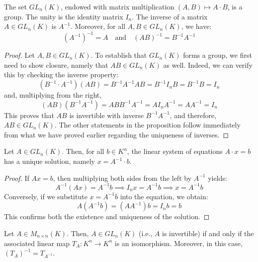 \begin{proposition} \label{prop:17.a.7}
The set $GL_n(K)$, endowed with matrix multiplication $(A, B) \mapsto A \cdot B$, is a group. The unity is the identity matrix $I_n$. The inverse of a matrix $A \in GL_n(K)$ is $A^{-1}$. Moreover, for all $A, B \in GL_n(K)$, we have:
\begin{equation*}
    (A^{-1})^{-1} = A \quad \text{and} \quad (AB)^{-1} = B^{-1}A^{-1}
\end{equation*}
\end{proposition}

\begin{proof}
Let $A, B \in GL_n(K)$. To establish that $GL_n(K)$ forms a group, we first need to show closure, namely that $AB \in GL_n(K)$ as well. Indeed, we can verify this by checking the inverse property:
\begin{equation*}
    (B^{-1} \cdot A^{-1})(AB) = B^{-1}A^{-1}AB = B^{-1}I_nB = B^{-1}B = I_n
\end{equation*}
and, multiplying from the right,
\begin{equation*}
    (AB)(B^{-1}A^{-1}) = ABB^{-1}A^{-1} = AI_nA^{-1} = AA^{-1} = I_n
\end{equation*}
This proves that $AB$ is invertible with inverse $B^{-1}A^{-1}$, and therefore, $AB \in GL_n(K)$. The other statements in the proposition follow immediately from what we have proved earlier regarding the uniqueness of inverses.
\end{proof}

\begin{corollary} \label{cor:17.a.8}
Let $A \in GL_n(K)$. Then, for all $b \in K^n$, the linear system of equations $A \cdot x = b$ has a unique solution, namely $x = A^{-1} \cdot b$.
\end{corollary}

\begin{proof}
If $Ax = b$, then multiplying both sides from the left by $A^{-1}$ yields:
\begin{equation*}
    A^{-1}(Ax) = A^{-1}b \implies I_n x = A^{-1}b \implies x = A^{-1}b
\end{equation*}
Conversely, if we substitute $x = A^{-1}b$ into the equation, we obtain:
\begin{equation*}
    A(A^{-1}b) = (AA^{-1})b = I_n b = b
\end{equation*}
This confirms both the existence and uniqueness of the solution.
\end{proof}

\begin{proposition} \label{prop:17.a.9}
Let $A \in M_{n \times n}(K)$. Then, $A \in GL_n(K)$ (i.e., $A$ is invertible) if and only if the associated linear map $T_A: K^n \to K^n$ is an isomorphism. Moreover, in this case, $(T_A)^{-1} = T_{A^{-1}}$.
\end{proposition}

